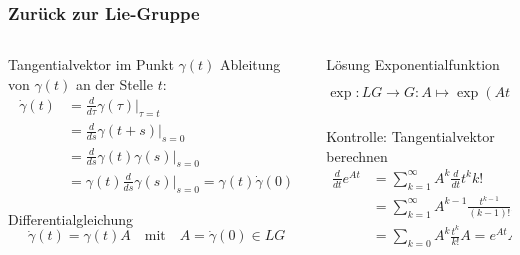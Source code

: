 %
%
%
\bgroup
\begin{frame}[t]
\setlength{\abovedisplayskip}{5pt}
\setlength{\belowdisplayskip}{5pt}
\frametitle{Zurück zur Lie-Gruppe}
\vspace{-20pt}
\begin{columns}[t,onlytextwidth]
\begin{column}{0.48\textwidth}
\begin{block}{Tangentialvektor im Punkt $\gamma(t)$}
Ableitung von $\gamma(t)$ an der Stelle $t$:
\begin{align*}
\dot{\gamma}(t)
&=
\frac{d}{d\tau}\gamma(\tau)\bigg|_{\tau=t}
\\
&=
\frac{d}{ds}
\gamma(t+s)
\bigg|_{s=0}
\\
&=
\frac{d}{ds}
\gamma(t)\gamma(s)
\bigg|_{s=0}
\\
&=
\gamma(t)
\frac{d}{ds}
\gamma(s)
\bigg|_{s=0}
=
\gamma(t) \dot{\gamma}(0)
\end{align*}
\end{block}
\vspace{-10pt}
\begin{block}{Differentialgleichung}
\vspace{-10pt}
\[
\dot{\gamma}(t) = \gamma(t) A
\quad
\text{mit}
\quad
A=\dot{\gamma}(0)\in LG
\]
\end{block}
\end{column}
\begin{column}{0.50\textwidth}
\begin{block}{Lösung}
Exponentialfunktion
\[
\exp\colon LG\to G : A \mapsto \exp(At) = \sum_{k=0}^\infty \frac{t^k}{k!}A^k
\]
\end{block}
\vspace{-5pt}
\begin{block}{Kontrolle: Tangentialvektor berechnen}
\vspace{-10pt}
\begin{align*}
\frac{d}{dt}e^{At}
&=
\sum_{k=1}^\infty A^k \frac{d}{dt} t^{k}{k!}
\\
&=
\sum_{k=1}^\infty A^{k-1}\frac{t^{k-1}}{(k-1)!} A
\\
&=
\sum_{k=0} A^k\frac{t^k}{k!}
A
=
e^{At} A
\end{align*}
\end{block}
\end{column}
\end{columns}
\end{frame}
\egroup

